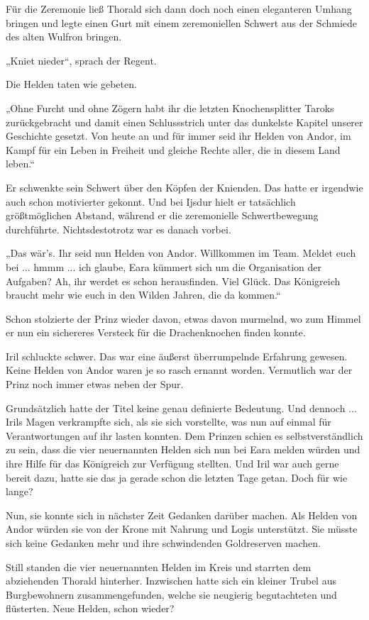 Für die Zeremonie ließ Thorald sich dann doch noch einen eleganteren Umhang bringen und legte einen Gurt mit einem zeremoniellen Schwert aus der Schmiede des alten Wulfron bringen.

„Kniet nieder“, sprach der Regent.

Die Helden taten wie gebeten.

„Ohne Furcht und ohne Zögern habt ihr die letzten Knochensplitter Taroks zurückgebracht und damit einen Schlussstrich unter das dunkelste Kapitel unserer Geschichte gesetzt. Von heute an und für immer seid ihr Helden von Andor, im Kampf für ein Leben in Freiheit und gleiche Rechte aller, die in diesem Land leben.“

Er schwenkte sein Schwert über den Köpfen der Knienden. Das hatte er irgendwie auch schon motivierter gekonnt. Und bei Ijsdur hielt er tatsächlich größtmöglichen Abstand, während er die zeremonielle Schwertbewegung durchführte. Nichtsdestotrotz war es danach vorbei.

„Das wär’s. Ihr seid nun Helden von Andor. Willkommen im Team. Meldet euch bei ... hmmm ... ich glaube, Eara kümmert sich um die Organisation der Aufgaben? Ah, ihr werdet es schon herausfinden. Viel Glück. Das Königreich braucht mehr wie euch in den Wilden Jahren, die da kommen.“

Schon stolzierte der Prinz wieder davon, etwas davon murmelnd, wo zum Himmel er nun ein sichereres Versteck für die Drachenknochen finden konnte.

Iril schluckte schwer. Das war eine äußerst überrumpelnde Erfahrung gewesen. Keine Helden von Andor waren je so rasch ernannt worden. Vermutlich war der Prinz noch immer etwas neben der Spur.

Grundsätzlich hatte der Titel keine genau definierte Bedeutung. Und dennoch ... Irils Magen verkrampfte sich, als sie sich vorstellte, was nun auf einmal für Verantwortungen auf ihr lasten konnten. Dem Prinzen schien es selbstverständlich zu sein, dass die vier neuernannten Helden sich nun bei Eara melden würden und ihre Hilfe für das Königreich zur Verfügung stellten. Und Iril war auch gerne bereit dazu, hatte sie das ja gerade schon die letzten Tage getan. Doch für wie lange?

Nun, sie konnte sich in nächster Zeit Gedanken darüber machen. Als Helden von Andor würden sie von der Krone mit Nahrung und Logis unterstützt. Sie müsste sich keine Gedanken mehr und ihre schwindenden Goldreserven machen.

Still standen die vier neuernannten Helden im Kreis und starrten dem abziehenden Thorald hinterher. Inzwischen hatte sich ein kleiner Trubel aus Burgbewohnern zusammengefunden, welche sie neugierig begutachteten und flüsterten. Neue Helden, schon wieder?





